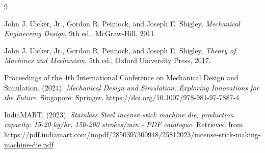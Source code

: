 {}
\begin{thebibliography}{9}

John J. Uicker, Jr., Gordon R. Pennock, and Joseph E. Shigley,
\textit{Mechanical Engineering Design}, 9th ed., McGraw-Hill, 2011.

John J. Uicker, Jr., Gordon R. Pennock, and Joseph E. Shigley,
\textit{Theory of Machines and Mechanism}, 5th ed., Oxford University Press, 2017.

Proceedings of the 4th International Conference on Mechanical Design and Simulation. 
(2024). \textit{Mechanical Design and Simulation: Exploring Innovations for the Future}. 
Singapore: Springer. https://doi.org/10.1007/978-981-97-7887-4


IndiaMART. (2023). \textit{Stainless Steel incense stick machine die, production capacity: 15-20 kg/hr, 150-200 strokes/min - PDF catalogue}. Retrieved from \url{https://pdf.indiamart.com/impdf/2850397300948/25812023/incense-stick-making-machine-die.pdf}
\sloppy

\end{thebibliography}